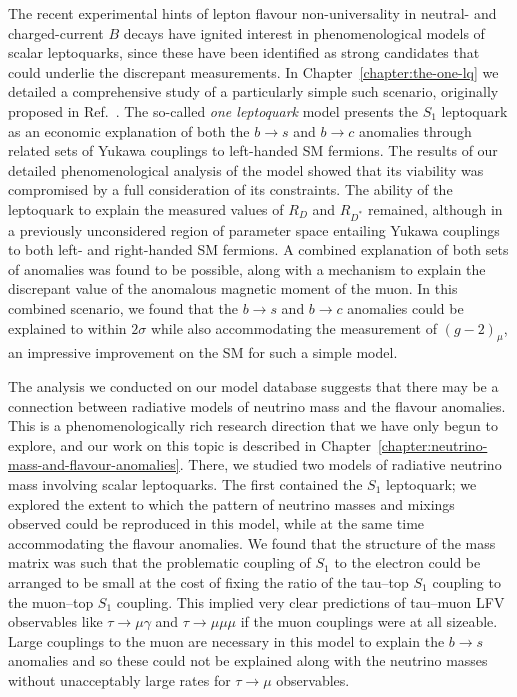 The recent experimental hints of lepton flavour non-universality in neutral- and
charged-current $B$ decays have ignited interest in phenomenological models of
scalar leptoquarks, since these have been identified as strong candidates that
could underlie the discrepant measurements. In Chapter~\ref{chapter:the-one-lq}
we detailed a comprehensive study of a particularly simple such scenario,
originally proposed in Ref.~\cite{Bauer:2015knc}. The so-called \textit{one
  leptoquark} model presents the $S_{1}$ leptoquark as an economic explanation
of both the $b \to s$ and $b \to c$ anomalies through related sets of Yukawa
couplings to left-handed SM fermions. The results of our detailed
phenomenological analysis of the model showed that its viability was compromised
by a full consideration of its constraints. The ability of the leptoquark to
explain the measured values of $R_{D}$ and $R_{D^{*}}$ remained, although in a
previously unconsidered region of parameter space entailing Yukawa couplings to
both left- and right-handed SM fermions. A combined explanation of both sets of
anomalies was found to be possible, along with a mechanism to explain the
discrepant value of the anomalous magnetic moment of the muon. In this combined
scenario, we found that the $b \to s$ and $b \to c$ anomalies could be explained
to within $2\sigma$ while also accommodating the measurement of $(g-2)_{\mu}$,
an impressive improvement on the SM for such a simple model.

The analysis we conducted on our model database suggests that there may be a
connection between radiative models of neutrino mass and the flavour anomalies.
This is a phenomenologically rich research direction that we have only begun to
explore, and our work on this topic is described in
Chapter~\ref{chapter:neutrino-mass-and-flavour-anomalies}. There, we studied two
models of radiative neutrino mass involving scalar leptoquarks. The first
contained the $S_{1}$ leptoquark; we explored the extent to which the pattern of
neutrino masses and mixings observed could be reproduced in this model, while at
the same time accommodating the flavour anomalies. We found that the structure
of the mass matrix was such that the problematic coupling of $S_{1}$ to the
electron could be arranged to be small at the cost of fixing the ratio of the
tau--top $S_{1}$ coupling to the muon--top $S_{1}$ coupling. This implied very
clear predictions of tau--muon LFV observables like $\tau \to \mu \gamma$ and
$\tau \to \mu\mu\mu$ if the muon couplings were at all sizeable. Large couplings
to the muon are necessary in this model to explain the $b \to s$ anomalies and
so these could not be explained along with the neutrino masses without
unacceptably large rates for $\tau \to \mu$ observables.

